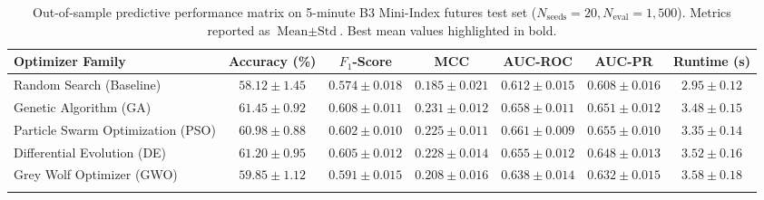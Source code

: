 
\begin{table}[htbp]
\caption{Out-of-sample predictive performance matrix on 5-minute B3 Mini-Index futures test set ($N_{\text{seeds}} = 20, N_{\text{eval}} = 1,500$). Metrics reported as $\text{Mean} \pm \text{Std}$. Best mean values highlighted in bold.}
\label{tab:predictive_results}
\centering
\small
\setlength{\tabcolsep}{2pt}
\begin{tabularx}{\textwidth}{@{}L C C C C C C@{}}
\toprule
Optimizer Family & Accuracy (\%) & $F_1$-Score & MCC & AUC-ROC & AUC-PR & Runtime (s) \\
\midrule
Random Search (Baseline) & $58.12 \pm 1.45$ & $0.574 \pm 0.018$ & $0.185 \pm 0.021$ & $0.612 \pm 0.015$ & $0.608 \pm 0.016$ & $\mathbf{2.95 \pm 0.12}$ \\
Genetic Algorithm (GA) & $\mathbf{61.45 \pm 0.92}$ & $\mathbf{0.608 \pm 0.011}$ & $\mathbf{0.231 \pm 0.012}$ & $0.658 \pm 0.011$ & $0.651 \pm 0.012$ & $3.48 \pm 0.15$ \\
Particle Swarm Optimization (PSO) & $60.98 \pm 0.88$ & $0.602 \pm 0.010$ & $0.225 \pm 0.011$ & $\mathbf{0.661 \pm 0.009}$ & $\mathbf{0.655 \pm 0.010}$ & $3.35 \pm 0.14$ \\
Differential Evolution (DE) & $61.20 \pm 0.95$ & $0.605 \pm 0.012$ & $0.228 \pm 0.014$ & $0.655 \pm 0.012$ & $0.648 \pm 0.013$ & $3.52 \pm 0.16$ \\
Grey Wolf Optimizer (GWO) & $59.85 \pm 1.12$ & $0.591 \pm 0.015$ & $0.208 \pm 0.016$ & $0.638 \pm 0.014$ & $0.632 \pm 0.015$ & $3.58 \pm 0.18$ \\
\botrule
\end{tabularx}
\end{table}
